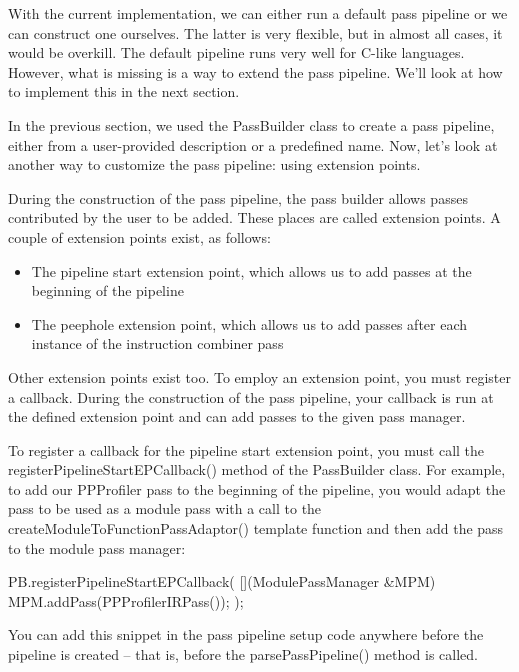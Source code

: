With the current implementation, we can either run a default pass pipeline or we can construct one ourselves. The latter is very flexible, but in almost all cases, it would be overkill. The default pipeline runs very well for C-like languages. However, what is missing is a way to extend the pass pipeline. We’ll look at how to implement this in the next section.


In the previous section, we used the PassBuilder class to create a pass pipeline, either from a user-provided description or a predefined name. Now, let’s look at another way to customize the pass pipeline: using extension points.

During the construction of the pass pipeline, the pass builder allows passes contributed by the user to be added. These places are called extension points. A couple of extension points exist, as follows:

\begin{itemize}
\item
The pipeline start extension point, which allows us to add passes at the beginning of the pipeline

\item
The peephole extension point, which allows us to add passes after each instance of the instruction combiner pass
\end{itemize}

Other extension points exist too. To employ an extension point, you must register a callback. During the construction of the pass pipeline, your callback is run at the defined extension point and can add passes to the given pass manager.

To register a callback for the pipeline start extension point, you must call the registerPipelineStartEPCallback() method of the PassBuilder class. For example, to add our PPProfiler pass to the beginning of the pipeline, you would adapt the pass to be used as a module pass with a call to the createModuleToFunctionPassAdaptor() template function and then add the pass to the module pass manager:

\begin{cpp}
PB.registerPipelineStartEPCallback(
    [](ModulePassManager &MPM) {
        MPM.addPass(PPProfilerIRPass());
    });
\end{cpp}

You can add this snippet in the pass pipeline setup code anywhere before the pipeline is created – that is, before the parsePassPipeline() method is called.

